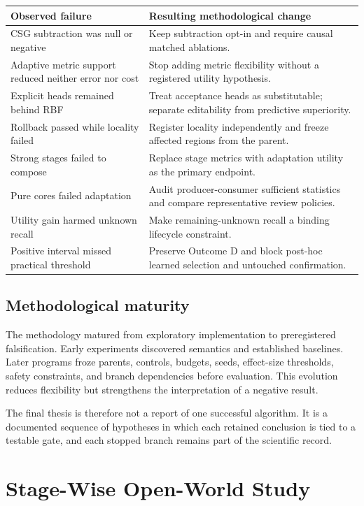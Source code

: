 \documentclass[12pt,oneside]{report}
\begin{document}
\begin{longtable}{
>{\raggedright\arraybackslash}p{1.85in}
>{\raggedright\arraybackslash}p{3.35in}}
\toprule
\textbf{Observed failure} & \textbf{Resulting methodological change}\\
\midrule
\endhead
CSG subtraction was null or negative & Keep subtraction opt-in and require
causal matched ablations.\\
Adaptive metric support reduced neither error nor cost & Stop adding metric
flexibility without a registered utility hypothesis.\\
Explicit heads remained behind RBF & Treat acceptance heads as substitutable;
separate editability from predictive superiority.\\
Rollback passed while locality failed & Register locality independently and
freeze affected regions from the parent.\\
Strong stages failed to compose & Replace stage metrics with adaptation
utility as the primary endpoint.\\
Pure cores failed adaptation & Audit producer-consumer sufficient statistics
and compare representative review policies.\\
Utility gain harmed unknown recall & Make remaining-unknown recall a binding
lifecycle constraint.\\
Positive interval missed practical threshold & Preserve Outcome D and block
post-hoc learned selection and untouched confirmation.\\
\bottomrule
\end{longtable}

\section{Methodological maturity}

The methodology matured from exploratory implementation to preregistered
falsification. Early experiments discovered semantics and established
baselines. Later programs froze parents, controls, budgets, seeds, effect-size
thresholds, safety constraints, and branch dependencies before evaluation.
This evolution reduces flexibility but strengthens the interpretation of a
negative result.

The final thesis is therefore not a report of one successful algorithm. It is
a documented sequence of hypotheses in which each retained conclusion is tied
to a testable gate, and each stopped branch remains part of the scientific
record.

\chapter{Stage-Wise Open-World Study}
\end{document}
